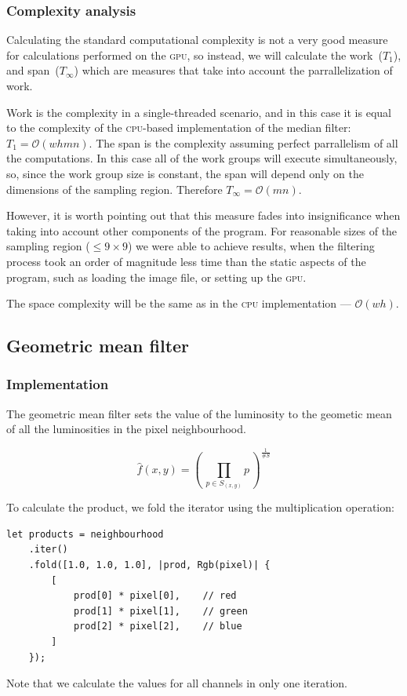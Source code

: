 \documentclass[12pt]{article}
\theoremstyle{definition}
\begin{document}
\subsubsection{Complexity analysis}

Calculating the standard computational complexity is not a very good measure for calculations performed on the \textsc{gpu},
so instead, we will calculate the work~($T_1$), and span~($T_\infty$) which are measures that take into account the parrallelization of work.

Work is the complexity in a single-threaded scenario, and in this case it is equal to the complexity of the \textsc{cpu}-based implementation of the median filter: $T_1 = \mathcal{O}(whmn)$.
The span is the complexity assuming perfect parrallelism of all the computations.
In this case all of the work groups will execute simultaneously, so, since the work group size is constant,
the span will depend only on the dimensions of the sampling region.
Therefore $T_\infty = \mathcal{O}(mn)$.

However, it is worth pointing out
that this measure fades into insignificance 
when taking into account other components of the program. 
For reasonable sizes of the sampling region ($\leq 9\times9$)
we were able to achieve results, when the filtering process took an order of magnitude less time
than the static aspects of the program, such as loading the image file, or setting up the \textsc{gpu}.

The space complexity will be the same as in the \textsc{cpu} implementation --- $\mathcal{O}(wh)$.

\subsection{Geometric mean filter}

\subsubsection{Implementation}

The geometric mean filter sets the value of the luminosity 
to the geometic mean of all the luminosities in the pixel neighbourhood.

\begin{equation}
    \hat{f}(x,y) = \left(\, \prod_{p \in S_{(x,y)}} \!\!\!p \,\right)^{\frac{1}{\#S}}
\end{equation}


To calculate the product, we fold the iterator using the multiplication operation: 
\begin{lstlisting}
let products = neighbourhood
    .iter()
    .fold([1.0, 1.0, 1.0], |prod, Rgb(pixel)| {
        [
            prod[0] * pixel[0],    // red
            prod[1] * pixel[1],    // green
            prod[2] * pixel[2],    // blue
        ]
    });
\end{lstlisting}
Note that we calculate the values for all channels in only one iteration.
\end{document}
